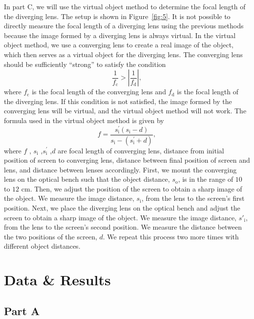 \documentclass[10pt]{article}
\begin{document}
In part C, we will use the virtual object method to determine the focal length of the diverging lens. The setup is shown in Figure~\ref{fig:5}. It is not possible to directly measure the focal length of a diverging lens using the previous methods because the image formed by a diverging lens is always virtual. In the virtual object method, we use a converging lens to create a real image of the object, which then serves as a virtual object for the diverging lens. The converging lens should be sufficiently \enquote{strong} to satisfy the condition 
\begin{equation}
  \dfrac{1}{f_{\text{c}}} > \left| \dfrac{1}{f_{\text{d}}} \right|,
\end{equation}
where $f_{\text{c}}$ is the focal length of the converging lens and $f_{\text{d}}$ is the focal length of the diverging lens. If this condition is not satisfied, the image formed by the converging lens will be virtual, and the virtual object method will not work. The formula used in the virtual object method is given by
\begin{equation}
  f = \dfrac{s^{'}_{\text{i}} \left( s_{\text{i}} - d \right)}{s_{\text{i}} - \left( s^{'}_{\text{i}} + d \right)},
\end{equation}
where $f$ , $s_{\text{i}}$ ,$s^{'}_{\text{i}}$ ,$d$ are focal length of converging lens, distance from initial position of screen to converging lens, distance between final position of screen and lens, and distance between lenses accordingly. First, we mount the converging lens on the optical bench such that the object distance, $s_{\text{o}}$, is in the range of $10$ to $12$ cm. Then, we adjust the position of the screen to obtain a sharp image of the object. We measure the image distance, $s_{\text{i}}$, from the lens to the screen's first position. Next, we place the diverging lens on the optical bench and adjust the screen to obtain a sharp image of the object. We measure the image distance, $s'_{\text{i}}$, from the lens to the screen's second position. We measure the distance between the two positions of the screen, $d$. We repeat this process two more times with different object distances.


\section{Data \& Results}

\subsection*{Part A}
\end{document}
